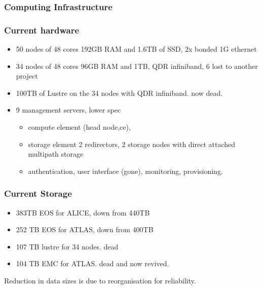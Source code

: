 \documentclass{beamer}
\begin{document}
\begin{frame}
  \frametitle{Computing Infrastructure}
\end{frame}
\begin{frame}
  \frametitle{Current hardware}
  \begin{itemize}
    \item 50 nodes of 48 cores 192GB RAM and 1.6TB of SSD, 2x bonded 1G ethernet
    \item 34 nodes of 48 cores 96GB RAM and 1TB, QDR infiniband, 6 lost to another project
    \item 100TB of Lustre on the 34 nodes with QDR infiniband. now dead.
    \item 9 management servers, lower spec 
  \begin{itemize}
    \item compute element (head node,ce),
    \item storage element 2 redirectors, 2 storage nodes with direct attached multipath storage
    \item authentication, user interface (gone), monitoring, provisioning. 
  \end{itemize}
  \end{itemize}
\end{frame}

\begin{frame}
  \frametitle{Current Storage}
  \begin{itemize}
    \item 383TB EOS for ALICE, down from 440TB
    \item 252 TB EOS for ATLAS, down from 400TB
    \item 107 TB lustre for 34 nodes. dead
    \item 104 TB EMC for ATLAS. dead and now revived.
  \end{itemize}
Reduction in data sizes is due to reorganisation for reliability.
\end{frame}
\end{document}
